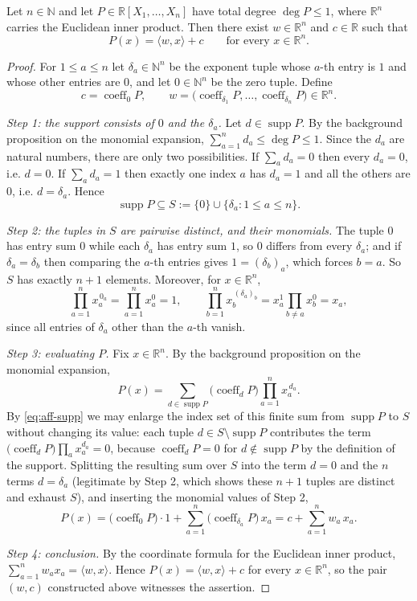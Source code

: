 \begin{lemma}
Let $n\in\mathbb{N}$ and let $P\in\mathbb{R}[X_1,\dots,X_n]$ have total degree
$\deg P\le1$, where $\mathbb{R}^n$ carries the Euclidean inner product. Then
there exist $w\in\mathbb{R}^n$ and $c\in\mathbb{R}$ such that
\[
  P(x)=\langle w,x\rangle+c\qquad\text{for every }x\in\mathbb{R}^n .
\]
\end{lemma}
\begin{proof}
For $1\le a\le n$ let $\delta_a\in\mathbb{N}^n$ be the exponent tuple whose
$a$-th entry is $1$ and whose other entries are $0$, and let
$0\in\mathbb{N}^n$ be the zero tuple. Define
\[
  c=\operatorname{coeff}_0P,
  \qquad
  w=\bigl(\operatorname{coeff}_{\delta_1}P,\dots,\operatorname{coeff}_{\delta_n}P\bigr)
  \in\mathbb{R}^n .
\]

\emph{Step 1: the support consists of $0$ and the $\delta_a$.} Let
$d\in\operatorname{supp}P$. By the background proposition on the monomial
expansion, $\sum_{a=1}^{n}d_a\le\deg P\le1$. Since the $d_a$ are natural
numbers, there are only two possibilities. If $\sum_a d_a=0$ then every $d_a=0$,
i.e. $d=0$. If $\sum_a d_a=1$ then exactly one index $a$ has $d_a=1$ and all the
others are $0$, i.e. $d=\delta_a$. Hence
\begin{equation}\label{eq:aff-supp}
  \operatorname{supp}P\subseteq S:=\{0\}\cup\{\delta_a:1\le a\le n\}.
\end{equation}

\emph{Step 2: the tuples in $S$ are pairwise distinct, and their monomials.} The
tuple $0$ has entry sum $0$ while each $\delta_a$ has entry sum $1$, so $0$
differs from every $\delta_a$; and if $\delta_a=\delta_b$ then comparing the
$a$-th entries gives $1=(\delta_b)_a$, which forces $b=a$. So $S$ has exactly
$n+1$ elements. Moreover, for $x\in\mathbb{R}^n$,
\[
  \prod_{a=1}^{n}x_a^{\,0_a}=\prod_{a=1}^{n}x_a^{0}=1,
  \qquad
  \prod_{b=1}^{n}x_b^{\,(\delta_a)_b}=x_a^{1}\prod_{b\ne a}x_b^{0}=x_a ,
\]
since all entries of $\delta_a$ other than the $a$-th vanish.

\emph{Step 3: evaluating $P$.} Fix $x\in\mathbb{R}^n$. By the background
proposition on the monomial expansion,
\[
  P(x)=\sum_{d\in\operatorname{supp}P}\bigl(\operatorname{coeff}_dP\bigr)
        \prod_{a=1}^{n}x_a^{\,d_a}.
\]
By \eqref{eq:aff-supp} we may enlarge the index set of this finite sum from
$\operatorname{supp}P$ to $S$ without changing its value: each tuple
$d\in S\setminus\operatorname{supp}P$ contributes the term
$\bigl(\operatorname{coeff}_dP\bigr)\prod_ax_a^{d_a}=0$, because
$\operatorname{coeff}_dP=0$ for $d\notin\operatorname{supp}P$ by the definition
of the support. Splitting the resulting sum over $S$ into the term $d=0$ and the
$n$ terms $d=\delta_a$ (legitimate by Step 2, which shows these $n+1$ tuples are
distinct and exhaust $S$), and inserting the monomial values of Step 2,
\[
  P(x)=\bigl(\operatorname{coeff}_0P\bigr)\cdot1
       +\sum_{a=1}^{n}\bigl(\operatorname{coeff}_{\delta_a}P\bigr)\,x_a
      =c+\sum_{a=1}^{n}w_a\,x_a .
\]

\emph{Step 4: conclusion.} By the coordinate formula for the Euclidean inner
product, $\sum_{a=1}^{n}w_a x_a=\langle w,x\rangle$. Hence
$P(x)=\langle w,x\rangle+c$ for every $x\in\mathbb{R}^n$, so the pair $(w,c)$
constructed above witnesses the assertion.
\end{proof}
